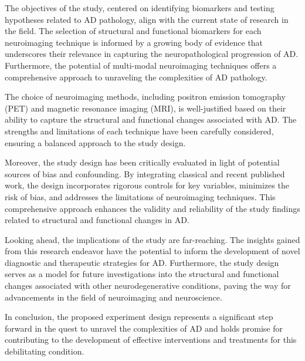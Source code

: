 \documentclass[10pt]{article}
\begin{document}
\begin{sloppypar}
  The objectives of the study, centered on identifying biomarkers and testing hypotheses related to AD pathology, align with the current state of research in the field. The selection of structural and functional biomarkers for each neuroimaging technique is informed by a growing body of evidence that underscores their relevance in capturing the neuropathological progression of AD. Furthermore, the potential of multi-modal neuroimaging techniques offers a comprehensive approach to unraveling the complexities of AD pathology.

  The choice of neuroimaging methods, including positron emission tomography (PET) and magnetic resonance imaging (MRI), is well-justified based on their ability to capture the structural and functional changes associated with AD. The strengths and limitations of each technique have been carefully considered, ensuring a balanced approach to the study design.

  Moreover, the study design has been critically evaluated in light of potential sources of bias and confounding. By integrating classical and recent published work, the design incorporates rigorous controls for key variables, minimizes the risk of bias, and addresses the limitations of neuroimaging techniques. This comprehensive approach enhances the validity and reliability of the study findings related to structural and functional changes in AD.

  Looking ahead, the implications of the study are far-reaching. The insights gained from this research endeavor have the potential to inform the development of novel diagnostic and therapeutic strategies for AD. Furthermore, the study design serves as a model for future investigations into the structural and functional changes associated with other neurodegenerative conditions, paving the way for advancements in the field of neuroimaging and neuroscience.

  In conclusion, the proposed experiment design represents a significant step forward in the quest to unravel the complexities of AD and holds promise for contributing to the development of effective interventions and treatments for this debilitating condition.

  \pagebreak
  \singlespacing %
  
  

\end{sloppypar}
\end{document}
